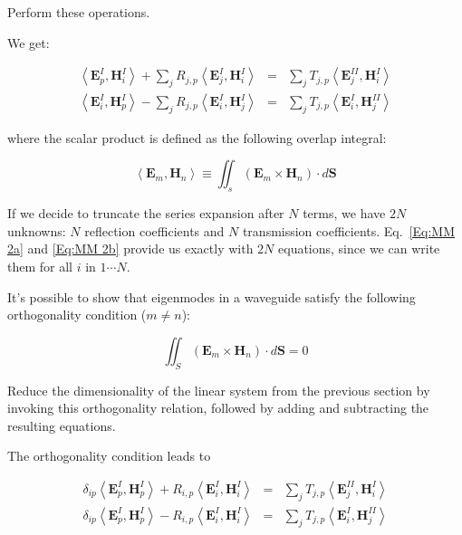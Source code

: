 \begin{cue}
  Perform these operations.
\end{cue}

We get:

\begin{eqnarray}
\left\langle \mathbf{E}^{I}_{p},\mathbf{H}^{I}_{i}\right\rangle +\sum _{j}R_{j,p}\left\langle \mathbf{E}^{I}_{j},\mathbf{H}^{I}_{i}\right\rangle  & = & \sum _{j}T_{j,p}\left\langle \mathbf{E}^{II}_{j},\mathbf{H}^{I}_{i}\right\rangle \label{Eq:MM 2a} \\
\left\langle \mathbf{E}^{I}_{i},\mathbf{H}^{I}_{p}\right\rangle -\sum _{j}R_{j,p}\left\langle \mathbf{E}^{I}_{i},\mathbf{H}^{I}_{j}\right\rangle  & = & \sum _{j}T_{j,p}\left\langle \mathbf{E}^{I}_{i},\mathbf{H}^{II}_{j}\right\rangle \label{Eq:MM 2b} 
\end{eqnarray}

\noindent{}where the scalar product is defined as the following overlap integral:

\begin{equation} 
\left\langle \mathbf{E}_{m},\mathbf{H}_{n}\right\rangle \equiv \iint _{s}\left( \mathbf{E}_{m}\times \mathbf{H}_{n}\right) \cdot d{\mathbf S}
\end{equation} 

If we decide to truncate the series expansion after $N$ terms, we have $2N$ unknowns: $N$ reflection coefficients and $N$ transmission coefficients. Eq.~\ref{Eq:MM 2a} and \ref{Eq:MM 2b} provide us exactly with $2N$ equations, since we can write them for all $i$ in $1 \cdots N$.


It's possible to show that eigenmodes in a waveguide satisfy the following orthogonality condition ($m \ne n$):

$$\iint_{S}\left( \mathbf{E}_{m}\times \mathbf{H}_{n}\right) \cdot d{\mathbf S}=0$$

\begin{cue}
Reduce the dimensionality of the linear system from the previous section by invoking this orthogonality relation, followed by adding and subtracting the resulting equations.
\end{cue}

The orthogonality condition leads to
  
\begin{eqnarray}
\delta _{ip}\left\langle \mathbf{E}^{I}_{p},\mathbf{H}^{I}_{p}\right\rangle +R_{i,p}\left\langle \mathbf{E}^{I}_{i},\mathbf{H}^{I}_{i}\right\rangle  & = & \sum _{j}T_{j,p}\left\langle \mathbf{E}^{II}_{j},\mathbf{H}^{I}_{i}\right\rangle \label{Eq:MM 3a} \\
\delta _{ip}\left\langle \mathbf{E}^{I}_{p},\mathbf{H}^{I}_{p}\right\rangle -R_{i,p}\left\langle \mathbf{E}^{I}_{i},\mathbf{H}^{I}_{i}\right\rangle  & = & \sum _{j}T_{j,p}\left\langle \mathbf{E}^{I}_{i},\mathbf{H}^{II}_{j}\right\rangle \label{Eq:MM 3b} 
\end{eqnarray}


